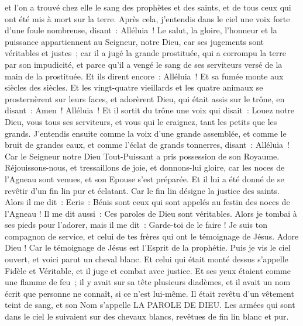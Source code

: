 \begin{multicols}{2}
et l'on a trouvé chez elle le sang des prophètes et des saints, et de tous ceux qui ont été mis à mort sur la terre.
\VerseOne{}Après cela, j'entendis dans le ciel une voix forte d'une foule nombreuse, disant~: Alléluia~! Le salut, la gloire, l'honneur et la puissance appartiennent au Seigneur, notre Dieu,
car ses jugements sont véritables et justes~; car il a jugé la grande prostituée, qui a corrompu la terre par son impudicité, et parce qu'il a vengé le sang de ses serviteurs versé de la main de la prostituée.
Et ils dirent encore~: Alléluia~! Et sa fumée monte aux siècles des siècles.
Et les vingt-quatre vieillards et les quatre animaux se prosternèrent sur leurs faces, et adorèrent Dieu, qui était assis sur le trône, en disant~: Amen~! Alléluia~!
Et il sortit du trône une voix qui disait~: Louez notre Dieu, vous tous ses serviteurs, et vous qui le craignez, tant les petits que les grands.
J'entendis ensuite comme la voix d'une grande assemblée, et comme le bruit de grandes eaux, et comme l'éclat de grands tonnerres, disant~: Alléluia~! Car le Seigneur notre Dieu Tout-Puissant a pris possession de son Royaume.
Réjouissons-nous, et tressaillons de joie, et donnons-lui gloire, car les noces de l'Agneau sont venues, et son Epouse s'est préparée.
Et il lui a été donné de se revêtir d'un fin lin pur et éclatant. Car le fin lin désigne la justice des saints.
Alors il me dit~: Ecris~: Bénis sont ceux qui sont appelés au festin des noces de l'Agneau ! Il me dit aussi~: Ces paroles de Dieu sont véritables.
Alors je tombai à ses pieds pour l'adorer, mais il me dit~: Garde-toi de le faire ! Je suis ton compagnon de service, et celui de tes frères qui ont le témoignage de Jésus. Adore Dieu ! Car le témoignage de Jésus est l'Esprit de la prophétie.
Puis je vis le ciel ouvert, et voici parut un cheval blanc. Et celui qui était monté dessus s'appelle Fidèle et Véritable, et il juge et combat avec justice.
Et ses yeux étaient comme une flamme de feu~; il y avait sur sa tête plusieurs diadèmes, et il avait un nom écrit que personne ne connaît, si ce n'est lui-même.
Il était revêtu d'un vêtement teint de sang, et son Nom s'appelle LA PAROLE DE DIEU.
Les armées qui sont dans le ciel le suivaient sur des chevaux blancs, revêtues de fin lin blanc et pur.

\end{multicols}

